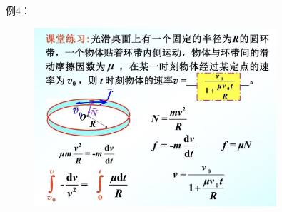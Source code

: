\documentclass[10pt,a4paper]{article}
\begin{document}
例4：
\begin{figure}[h]
    \centering
    \includegraphics[width=0.8\textwidth]{eg4.jpg}
    \end{figure}
\end{document}
